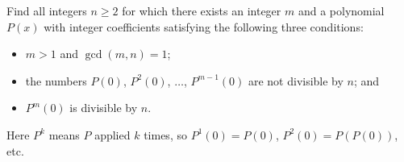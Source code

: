 Find all integers $n \ge 2$ for which there exists an integer $m$ and a polynomial $P(x)$ with integer coefficients satisfying the following three conditions:

\begin{itemize}
	\item $m > 1$ and $\gcd(m,n) = 1$;
	\item the numbers $P(0)$,  $P^2(0)$,  $\ldots$,  $P^{m-1}(0)$ 		are not divisible by $n$; and
	\item $P^m(0)$ is divisible by $n$.
\end{itemize}

Here $P^k$ means $P$ applied $k$ times, so $P^1(0) = P(0)$,  $P^2(0) = P(P(0))$,  etc.
